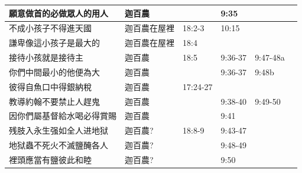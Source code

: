 \begin{table}[H]
\begin{tabular}{p{13.07em}|l|l|l|p{5.285em}|r}
願意做首的必做眾人的用人& \multicolumn{1}{p{7.93em}|}{迦百農} & \multicolumn{1}{p{5.285em}|}{} & \multicolumn{1}{p{5.57em}|}{9:35} &  &  \\ \midrule


不成小孩子不得進天國& \multicolumn{1}{p{7.93em}|}{迦百農在屋裡} & \multicolumn{1}{p{5.285em}|}{18:2-3} & \multicolumn{1}{p{5.57em}|}{10:15} & &  \\ \midrule

謙卑像這小孩子是最大的& \multicolumn{1}{p{7.93em}|}{迦百農在屋裡} & \multicolumn{1}{p{5.285em}|}{18:4} & \multicolumn{1}{p{5.57em}|}{} & &  \\ \midrule


接待小孩就是接待主& \multicolumn{1}{p{7.93em}|}{迦百農} & \multicolumn{1}{p{5.285em}|}{18:5} & \multicolumn{1}{p{5.57em}|}{9:36-37} & 9:47-48a &  \\ \midrule

你們中間最小的他便為大& \multicolumn{1}{p{7.93em}|}{迦百農} & \multicolumn{1}{p{5.285em}|}{} & \multicolumn{1}{p{5.57em}|}{9:36-37} & 9:48b &  \\ \midrule

彼得自魚口中得銀納稅 & \multicolumn{1}{p{7.93em}|}{迦百農} & \multicolumn{1}{p{5.285em}|}{17:24-27} &       & \multicolumn{1}{r|}{} &  \\  \midrule

教導約翰不要禁止人趕鬼& \multicolumn{1}{p{7.93em}|}{迦百農} &&\multicolumn{1}{p{5.57em}|}{9:38-40} & 9:49-50 &  \\\midrule

因你們屬基督給水喝必得賞賜& \multicolumn{1}{p{7.93em}|}{迦百農} &&\multicolumn{1}{p{5.57em}|}{9:41} &  &  \\\midrule


残肢入永生强如全人进地狱& \multicolumn{1}{p{7.93em}|}{迦百農?} &\multicolumn{1}{p{5.285em}|}{18:8-9}&9:43-47&  &  \\\midrule
地狱蟲不死火不滅鹽醃各人& \multicolumn{1}{p{7.93em}|}{迦百農?} &\multicolumn{1}{p{5.285em}|}{}&9:48-49&  &  \\\midrule
裡頭應當有鹽彼此和睦& \multicolumn{1}{p{7.93em}|}{迦百農?} &\multicolumn{1}{p{5.285em}|}{}&9:50&  &  \\\midrule


\end{tabular}
\end{table}
